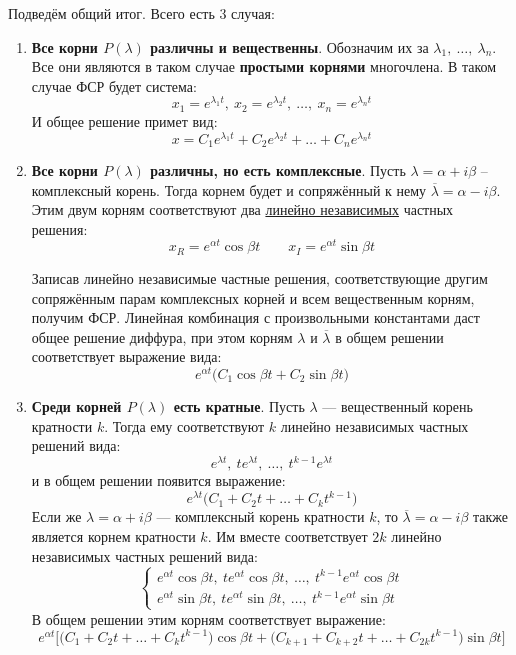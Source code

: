 \documentclass[a4paper,12pt]{article}
\begin{document}
Подведём общий итог. Всего есть 3 случая:
\begin{enumerate}
	\item \textbf{Все корни $P(\lambda)$ различны и вещественны}. 
	Обозначим их за $\lambda_1,\ \ldots,\ \lambda_n$. 
	Все они являются в таком случае \textbf{простыми корнями} многочлена. В таком случае ФСР будет система:
	\[x_1 = e^{\lambda_1t},\ x_2 = e^{\lambda_2t},\ \ldots,\ x_n = e^{\lambda_nt}\]
	И общее решение примет вид:
	\[x = C_1e^{\lambda_1t} + C_2e^{\lambda_2t} + \ldots + C_n e^{\lambda_nt}\]
	\item \textbf{Все корни $P(\lambda)$ различны, но есть комплексные}. 
	Пусть $\lambda = \alpha + i\beta$ -- комплексный корень.
	Тогда корнем будет и сопряжённый к нему $\overline{\lambda} = \alpha - i\beta$. Этим двум корням соответствуют два \underline{линейно независимых} частных решения:
	\[x_R = e^{\alpha t}\cos \beta t\qquad x_I = e^{\alpha t}\sin \beta t\]
	
	Записав линейно независимые частные решения, соответствующие другим сопряжённым парам комплексных корней и всем вещественным корням, получим ФСР. Линейная комбинация с произвольными константами даст общее решение диффура, при этом корням $\lambda$ и $\overline{\lambda}$ в общем решении соответствует выражение вида:
	\[e^{\alpha t}\big(C_1\cos \beta t + C_2\sin \beta t\big)\]
	\item \textbf{Среди корней $P(\lambda)$ есть кратные}. Пусть $\lambda$ --- вещественный корень кратности $k$. Тогда ему соответствуют $k$ линейно независимых частных решений вида:
	\[e^{\lambda t},\ te^{\lambda  t},\ \ldots,\ t^{k - 1}e^{\lambda  t}\]
	и в общем решении появится выражение:
	\[e^{\lambda t}\big(C_1 + C_2t + \ldots + C_k t^{k - 1}\big)\]
	Если же $\lambda  = \alpha + i\beta $ --- комплексный корень кратности $k$, то $\overline{\lambda} = \alpha - i\beta$ также является корнем кратности $k$. Им вместе соответствует $2k$ линейно независимых частных решений вида:
	\[\begin{cases}
		e^{\alpha t}\cos \beta t,\ te^{\alpha t}\cos \beta t,\ \ldots,\ t^{k - 1}e^{\alpha t}\cos \beta t\\
		e^{\alpha t}\sin \beta t,\ te^{\alpha t}\sin \beta t,\ \ldots,\ t^{k - 1}e^{\alpha t}\sin \beta t
	\end{cases}\]
	В общем решении этим корням соответствует выражение:
	\[e^{\alpha t}\Big[\big(C_1 + C_2t + \ldots + C_kt^{k - 1}\big)\cos \beta t + \big(C_{k + 1} + C_{k + 2}t + \ldots + C_{2k}t^{k - 1}\big)\sin \beta t\Big]\]
\end{enumerate}
\end{document}
